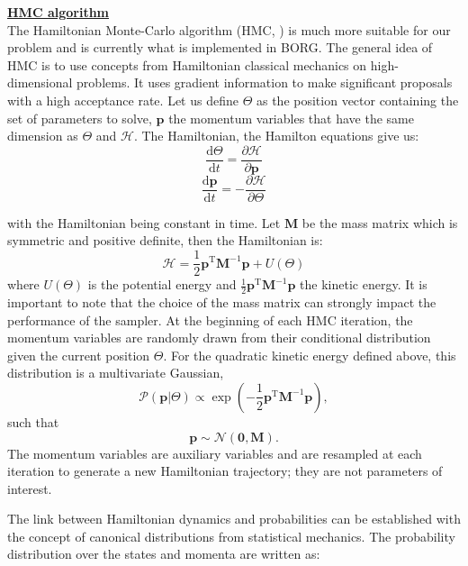 \noindent \textbf{\underline{HMC algorithm}} \\
The Hamiltonian Monte-Carlo algorithm (HMC, \cite{Brooks_2011}) is much more suitable for our problem and is currently what is implemented in BORG. The general idea of HMC is 
to use concepts from Hamiltonian classical mechanics on high-dimensional problems. It uses gradient information to make significant proposals with a high acceptance rate. 
Let us define $\Theta$ as the position vector containing the set of parameters to solve, $\textbf{p}$ the momentum variables that have the same 
dimension as $\Theta$ and $\mathcal{H}$. The Hamiltonian, 
the Hamilton equations give us: 
\begin{equation}
    \frac{\text{d}\Theta}{\text{d}t} = \frac{\partial \mathcal{H}}{\partial \textbf{p}}
\end{equation}
\begin{equation}
    \frac{\text{d}\textbf{p}}{\text{d}t} = -\frac{\partial \mathcal{H}}{\partial \Theta}
\end{equation}

with the Hamiltonian being constant in time. Let $\textbf{M}$ be the mass matrix which is symmetric and positive definite, then the Hamiltonian is: 
\begin{equation}
    \mathcal{H} = \frac{1}{2} \textbf{p}^{\text{T}}\textbf{M}^{-1}\textbf{p} + U(\Theta)
\end{equation}
where $U(\Theta)$ is the potential energy and $\frac{1}{2} \textbf{p}^{\text{T}}\textbf{M}^{-1}\textbf{p}$ the kinetic energy. It is important to note that the choice of 
the mass matrix can strongly impact the performance of the sampler. 
At the beginning of each HMC iteration, the
momentum variables are randomly drawn from their conditional distribution
given the current position $\Theta$. For the quadratic kinetic energy defined
above, this distribution is a multivariate Gaussian,
\begin{equation}
    \mathcal{P}(\textbf{p}|\Theta)
    \propto
    \exp\left(
    -\frac{1}{2}
    \textbf{p}^{\text{T}}\textbf{M}^{-1}\textbf{p}
    \right),
\end{equation}
such that
\begin{equation}
    \textbf{p} \sim \mathcal{N}(\mathbf{0},\mathbf{M}).
\end{equation}
The momentum variables are auxiliary variables and are resampled at each
iteration to generate a new Hamiltonian trajectory; they are not parameters
of interest.

The link between Hamiltonian dynamics and probabilities can be established with the concept of canonical distributions from statistical mechanics. The probability 
distribution over the states and momenta are written as:


